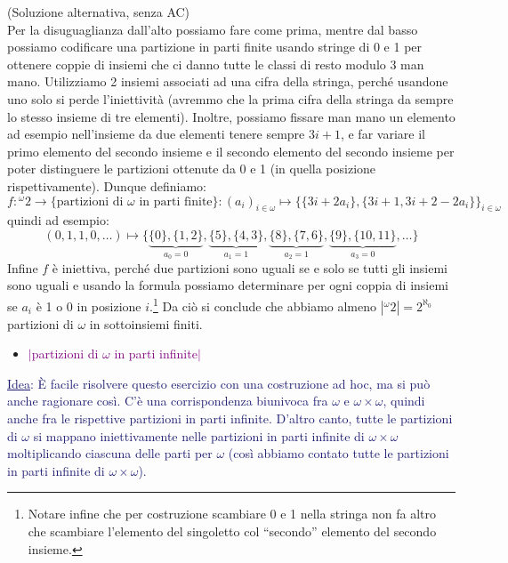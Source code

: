 \begin{soln}
	(Soluzione alternativa, senza AC)\\
	Per la disuguaglianza dall'alto possiamo fare come prima, mentre dal basso possiamo codificare una partizione in parti finite usando stringe di 0 e 1 per ottenere coppie di insiemi che ci danno tutte le classi di resto modulo 3 man mano.
	Utilizziamo 2 insiemi associati ad una cifra della stringa, perch\'e usandone uno solo si perde l'iniettivit\`a (avremmo che la prima cifra della stringa da sempre lo stesso insieme di tre elementi). Inoltre, possiamo fissare man mano un elemento ad esempio nell'insieme da due elementi tenere sempre $3i+1$,
	e far variare il primo elemento del secondo insieme e il secondo elemento del secondo insieme per poter distinguere le partizioni ottenute da 0 e 1 (in quella posizione rispettivamente). Dunque definiamo:
	\[ f : {}^\omega2 \to \{\text{partizioni di $\omega$ in parti finite}\} : (a_i)_{i \in \omega} \mapsto \{\{3i + 2a_i\},\{3i+1,3i+2-2a_i\}\}_{i \in \omega}
		\]
	quindi ad esempio:
	\[ (0,1,1,0,\ldots) \mapsto \{\underbrace{\{0\},\{1,2\}}_{a_0 = 0},\underbrace{\{5\},\{4,3\}}_{a_1 = 1},\underbrace{\{8\},\{7,6\}}_{a_2 = 1},\underbrace{\{9\},\{10,11\}}_{a_3 = 0},\ldots\}
		\]
	Infine $f$ \`e iniettiva, perch\'e due partizioni sono uguali se e solo se tutti gli insiemi sono uguali e usando la formula possiamo determinare per ogni coppia di insiemi se $a_i$ \`e 1 o 0 in posizione $i$.\footnote{Notare infine che per costruzione scambiare 0 e 1 nella stringa non fa altro che scambiare l'elemento del singoletto col ``secondo'' elemento del secondo insieme.}
	Da ci\`o si conclude che abbiamo almeno $|{}^\omega2| = 2^{\aleph_0}$ partizioni di $\omega$ in sottoinsiemi finiti.
\end{soln}

\begin{itemize}
	\item \textcolor{purple}{$|$partizioni di $\omega$ in parti infinite$|$}
\end{itemize}

\textcolor{MidnightBlue}{\underline{Idea}: \`E facile risolvere questo esercizio con una costruzione ad hoc, ma si pu\`o anche ragionare cos\`i. C'\`e una corrispondenza biunivoca fra $\omega$ e $\omega \times \omega$, quindi anche fra le rispettive partizioni in parti infinite.
D'altro canto, tutte le partizioni di $\omega$ si mappano iniettivamente nelle partizioni in parti infinite di $\omega \times \omega$ moltiplicando ciascuna delle parti per $\omega$ (cos\`i abbiamo contato tutte le partizioni in parti infinite di $\omega \times \omega$).}

